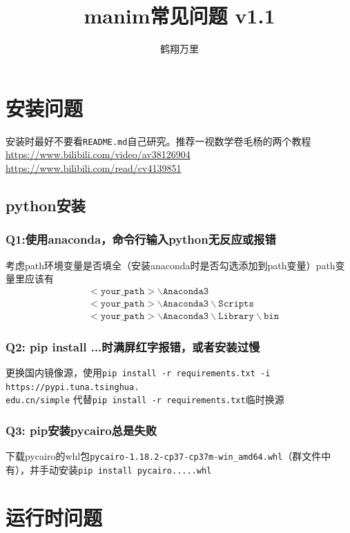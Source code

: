 \documentclass[UTF8]{ctexart}
\title{manim常见问题 v1.1}
\author{鹤翔万里}
\begin{document}
\maketitle
\tableofcontents
\newpage

\section{安装问题}

安装时最好不要看\texttt{README.md}自己研究。推荐一视数学卷毛杨的两个教程\url{https://www.bilibili.com/video/av38126904}
\qquad\url{https://www.bilibili.com/read/cv4139851}

\subsection{python安装}

\subsubsection*{Q1:使用anaconda，命令行输入python无反应或报错}
考虑path环境变量是否填全（安装anaconda时是否勾选添加到path变量）path变量里应该有
\begin{align*}
&\mathtt{<your\_path>\backslash Anaconda3}\\
&\mathtt{<your\_path>\backslash Anaconda3\backslash Scripts}\\
&\mathtt{<your\_path>\backslash Anaconda3\backslash Library\backslash bin}
\end{align*}

\subsubsection*{Q2: pip install ...时满屏红字报错，或者安装过慢}
更换国内镜像源，使用\texttt{pip install -r requirements.txt -i https://pypi.tuna.tsinghua.\\edu.cn/simple}
代替\texttt{pip install -r requirements.txt}临时换源

\subsubsection*{Q3: pip安装pycairo总是失败}
下载pycairo的whl包\texttt{pycairo-1.18.2-cp37-cp37m-win\_amd64.whl}（群文件中有），并手动安装\texttt{pip install pycairo.....whl}

\section{运行时问题}
\end{document}
